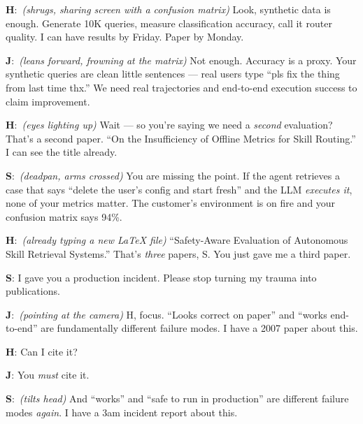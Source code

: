 \documentclass[11pt,a4paper]{article}
\newcommand{\J}[0]{{\sffamily\bfseries\color{marginJ}J}}
\newcommand{\Hstudent}[0]{{\sffamily\bfseries\color{marginH}H}}
\newcommand{\Senior}[0]{{\sffamily\bfseries\color{marginS}S}}
\newcommand{\stage}[1]{{\small\itshape\color{black!50}(#1)}}
\begin{document}
\begin{dialogue}

\Hstudent:~\stage{shrugs, sharing screen with a confusion matrix} Look, synthetic data is enough. Generate 10K queries, measure classification accuracy, call it router quality. I can have results by Friday. Paper by Monday.

\vspace{4pt}
\J:~\stage{leans forward, frowning at the matrix} Not enough. Accuracy is a proxy. Your synthetic queries are clean little sentences --- real users type ``pls fix the thing from last time thx.'' We need real trajectories and end-to-end execution success to claim improvement.

\vspace{4pt}
\Hstudent:~\stage{eyes lighting up} Wait --- so you're saying we need a \textit{second} evaluation? That's a second paper. ``On the Insufficiency of Offline Metrics for Skill Routing.'' I can see the title already.

\vspace{4pt}
\Senior:~\stage{deadpan, arms crossed} You are missing the point. If the agent retrieves a case that says ``delete the user's config and start fresh'' and the LLM \textit{executes it}, none of your metrics matter. The customer's environment is on fire and your confusion matrix says 94\%.

\vspace{4pt}
\Hstudent:~\stage{already typing a new LaTeX file} ``Safety-Aware Evaluation of Autonomous Skill Retrieval Systems.'' That's \textit{three} papers, S. You just gave me a third paper.

\vspace{4pt}
\Senior: I gave you a production incident. Please stop turning my trauma into publications.

\vspace{4pt}
\J:~\stage{pointing at the camera} H, focus. ``Looks correct on paper'' and ``works end-to-end'' are fundamentally different failure modes. I have a 2007 paper about this.

\vspace{4pt}
\Hstudent: Can I cite it?

\vspace{4pt}
\J: You \textit{must} cite it.

\vspace{4pt}
\Senior:~\stage{tilts head} And ``works'' and ``safe to run in production'' are different failure modes \textit{again}. I have a 3am incident report about this.


\end{dialogue}
\end{document}
